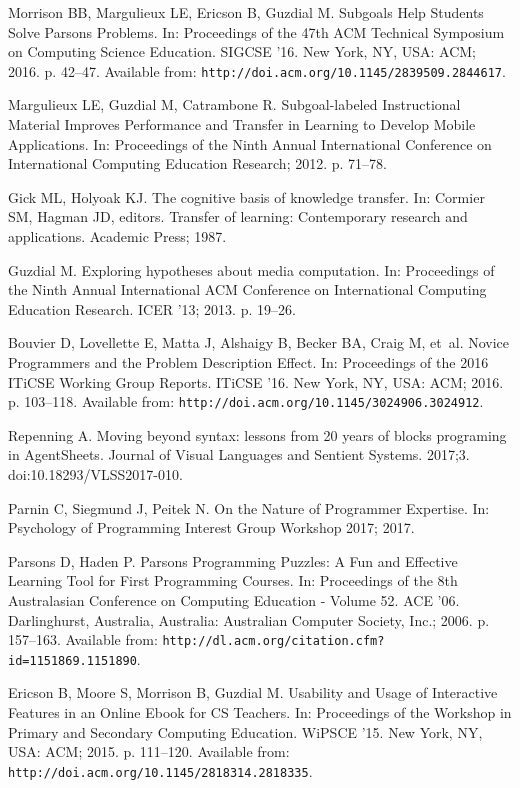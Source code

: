 \documentclass[10pt,letterpaper]{article}
\newcommand{\url}[1]{\texttt{#1}}
\begin{document}
\begin{thebibliography}{10}
Morrison BB, Margulieux LE, Ericson B, Guzdial M.
\newblock Subgoals Help Students Solve Parsons Problems.
\newblock In: Proceedings of the 47th ACM Technical Symposium on Computing
  Science Education. SIGCSE '16. New York, NY, USA: ACM; 2016. p. 42--47.
\newblock Available from: \url{http://doi.acm.org/10.1145/2839509.2844617}.

Margulieux LE, Guzdial M, Catrambone R.
\newblock Subgoal-labeled Instructional Material Improves Performance and
  Transfer in Learning to Develop Mobile Applications.
\newblock In: Proceedings of the Ninth Annual International Conference on
  International Computing Education Research; 2012. p. 71--78.

Gick ML, Holyoak KJ.
\newblock The cognitive basis of knowledge transfer.
\newblock In: Cormier SM, Hagman JD, editors. Transfer of learning:
  Contemporary research and applications. Academic Press; 1987.

Guzdial M.
\newblock Exploring hypotheses about media computation.
\newblock In: Proceedings of the Ninth Annual International ACM Conference on
  International Computing Education Research. ICER '13; 2013. p. 19--26.

Bouvier D, Lovellette E, Matta J, Alshaigy B, Becker BA, Craig M, et~al.
\newblock Novice Programmers and the Problem Description Effect.
\newblock In: Proceedings of the 2016 ITiCSE Working Group Reports. ITiCSE '16.
  New York, NY, USA: ACM; 2016. p. 103--118.
\newblock Available from: \url{http://doi.acm.org/10.1145/3024906.3024912}.

Repenning A.
\newblock Moving beyond syntax: lessons from 20 years of blocks programing in
  {AgentSheets}.
\newblock Journal of Visual Languages and Sentient Systems. 2017;3.
\newblock doi:{10.18293/VLSS2017-010}.

Parnin C, Siegmund J, Peitek N.
\newblock On the Nature of Programmer Expertise.
\newblock In: Psychology of Programming Interest Group Workshop 2017; 2017.

Parsons D, Haden P.
\newblock Parsons Programming Puzzles: A Fun and Effective Learning Tool for
  First Programming Courses.
\newblock In: Proceedings of the 8th Australasian Conference on Computing
  Education - Volume 52. ACE '06. Darlinghurst, Australia, Australia:
  Australian Computer Society, Inc.; 2006. p. 157--163.
\newblock Available from:
  \url{http://dl.acm.org/citation.cfm?id=1151869.1151890}.

Ericson B, Moore S, Morrison B, Guzdial M.
\newblock Usability and Usage of Interactive Features in an Online Ebook for CS
  Teachers.
\newblock In: Proceedings of the Workshop in Primary and Secondary Computing
  Education. WiPSCE '15. New York, NY, USA: ACM; 2015. p. 111--120.
\newblock Available from: \url{http://doi.acm.org/10.1145/2818314.2818335}.

\end{thebibliography}
\end{document}
